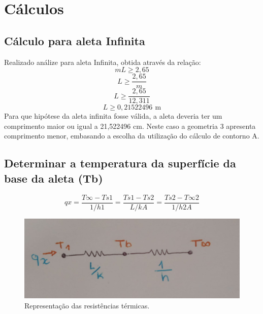 \chapter{Cálculos}\label{cap:calculus}

\section{Cálculo para aleta Infinita}\label{sec:infity}

Realizado análize para aleta Infinita, obtida através da relação:\\
\begin{equation}
    {m}{L}\geq{2,65}
\end{equation}
\begin{equation}
    {L}\geq{\frac{2,65}{m}}
\end{equation}
\begin{equation}
    {L}\geq{\frac{2,65}{12,311 }}
\end{equation}
\begin{equation}
    {L}\geq{0,21522496\,\SI{}{\meter}}
\end{equation}
Para que hipótese da aleta infinita fosse válida, a aleta deveria ter um
comprimento maior ou igual a 21,522496 cm.
Neste caso a geometria 3 apresenta comprimento menor, embasando a
escolha da utilização do cálculo de contorno A.

\section{Determinar a temperatura da superfície da base da aleta (Tb)}\label{sec:prob1}

\begin{equation}
    {qx}={\frac{T\infty-Ts1}{1/{h1}}}={\frac{Ts1-Ts2}{L/{{k}{A}}}}={\frac{Ts2-T\infty2}{1/{h2}{A}}}
\end{equation}

\begin{figure}[h]
    \centering
    \caption{Representação das resistências térmicas.}
    \label{fig:res}
    \includegraphics[width=14cm]{figuras/resistenciasTermicas.jpeg}
    \fonteproprioautor
\end{figure}

